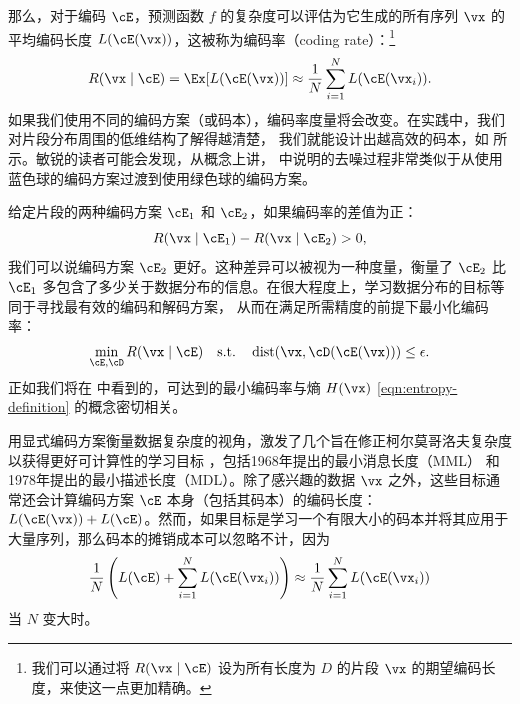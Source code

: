 \documentclass[../../book-main_zh.tex]{subfiles}
\begin{document}
那么，对于编码 \(\cE\)，预测函数 \(f\) 的复杂度可以评估为它生成的所有序列 \(\vx\) 的平均编码长度
\(L(\cE(\vx))\)，这被称为编码率（coding rate）：\footnote{我们可以通过将 \(R(\vx \mid
\cE)\) 设为所有长度为 \(D\) 的片段 \(\vx\) 的期望编码长度，来使这一点更加精确。}
\begin{equation}
    R(\vx \mid \cE) = \Ex[L(\cE(\vx))] \approx \frac{1}{N}\sum_{i=1}^{N}
    L(\cE(\vx_{i})).
    \label{eqn:coding-rate}
\end{equation}
如果我们使用不同的编码方案（或码本），编码率度量将会改变。在实践中，我们对片段分布周围的低维结构了解得越清楚，
我们就能设计出越高效的码本，如
 所示。敏锐的读者可能会发现，从概念上讲，
中说明的去噪过程非常类似于从使用蓝色球的编码方案过渡到使用绿色球的编码方案。

给定片段的两种编码方案 \(\cE_{1}\) 和 \(\cE_{2}\)，如果编码率的差值为正：
\begin{equation}
    R(\vx \mid \cE_{1}) -  R(\vx \mid \cE_{2}) > 0,
\end{equation}
我们可以说编码方案 \(\cE_{2}\) 更好。这种差异可以被视为一种度量，衡量了 \(\cE_{2}\) 比 \(\cE_{1}\)
多包含了多少关于数据分布的信息。在很大程度上，学习数据分布的目标等同于寻找最有效的编码和解码方案，
从而在满足所需精度的前提下最小化编码率：
\begin{equation}
    \min_{\cE, \cD} R(\vx \mid \cE) \quad \mathrm{s.t.} \quad
    \operatorname{dist}(\vx, \cD(\cE(\vx))) \leq \epsilon.
\end{equation}
正如我们将在  中看到的，可达到的最小编码率与熵 \(H(\vx)\)
\eqref{eqn:entropy-definition} 的概念密切相关。

\begin{remark}\label{rem:computable-complexity}
    用显式编码方案衡量数据复杂度的视角，激发了几个旨在修正柯尔莫哥洛夫复杂度以获得更好可计算性的学习目标
    \cite{WallaceC1999}，包括1968年提出的最小消息长度（MML）\cite{WallaceC1968}
    和1978年提出的最小描述长度（MDL）\cite{Rissanen-1978,HansenM2001}。除了感兴趣的数据
    \(\vx\) 之外，这些目标通常还会计算编码方案 \(\cE\) 本身（包括其码本）的编码长度：\(L(\cE(\vx)) +
    L(\cE)\)。然而，如果目标是学习一个有限大小的码本并将其应用于大量序列，那么码本的摊销成本可以忽略不计，因为
    \begin{equation}
        \frac{1}{N}\left( L(\cE) + \sum_{i=1}^{N}
        L(\cE(\vx_{i}))\right) \approx \frac{1}{N}\sum_{i=1}^{N} L(\cE(\vx_{i}))
    \end{equation}
    当 \(N\) 变大时。
\end{remark}
\end{document}
